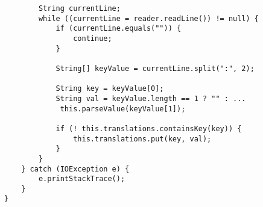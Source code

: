 \begin{lstlisting}
            String currentLine;
            while ((currentLine = reader.readLine()) != null) {
                if (currentLine.equals("")) {
                    continue;
                }

                String[] keyValue = currentLine.split(":", 2);

                String key = keyValue[0];
                String val = keyValue.length == 1 ? "" : ...
                 this.parseValue(keyValue[1]);

                if (! this.translations.containsKey(key)) {
                    this.translations.put(key, val);
                }
            }
        } catch (IOException e) {
            e.printStackTrace();
        }
    }
\end{lstlisting}
\vspace{2ex}
